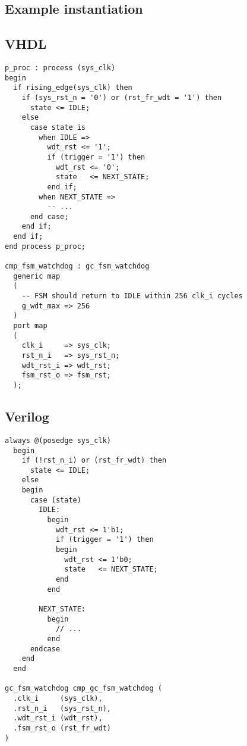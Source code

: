\documentclass[a4paper,11pt]{article}
\begin{document}
\pagebreak
\begin{appendices}

\section{Example instantiation}
\label{app:instantiation}

\subsection{VHDL}

\begin{verbatim}
p_proc : process (sys_clk)
begin
  if rising_edge(sys_clk) then
    if (sys_rst_n = '0') or (rst_fr_wdt = '1') then
      state <= IDLE;
    else
      case state is
        when IDLE =>
          wdt_rst <= '1';
          if (trigger = '1') then
            wdt_rst <= '0';
            state   <= NEXT_STATE;
          end if;
        when NEXT_STATE =>
          -- ...
      end case;
    end if;
  end if;
end process p_proc;

cmp_fsm_watchdog : gc_fsm_watchdog
  generic map
  (
    -- FSM should return to IDLE within 256 clk_i cycles
    g_wdt_max => 256
  )
  port map
  (
    clk_i     => sys_clk;
    rst_n_i   => sys_rst_n;
    wdt_rst_i => wdt_rst;
    fsm_rst_o => fsm_rst;
  );
\end{verbatim}

\pagebreak
\subsection{Verilog}

\begin{verbatim}
always @(posedge sys_clk)
  begin
    if (!rst_n_i) or (rst_fr_wdt) then
      state <= IDLE;
    else
    begin
      case (state)
        IDLE:
          begin
            wdt_rst <= 1'b1;
            if (trigger = '1') then
            begin
              wdt_rst <= 1'b0;
              state   <= NEXT_STATE;
            end
          end
          
        NEXT_STATE:
          begin
            // ...
          end
      endcase
    end
  end
  
gc_fsm_watchdog cmp_gc_fsm_watchdog (
  .clk_i     (sys_clk),
  .rst_n_i   (sys_rst_n),
  .wdt_rst_i (wdt_rst),
  .fsm_rst_o (rst_fr_wdt)
)
\end{verbatim}

\end{appendices}


%
%
\end{document}
